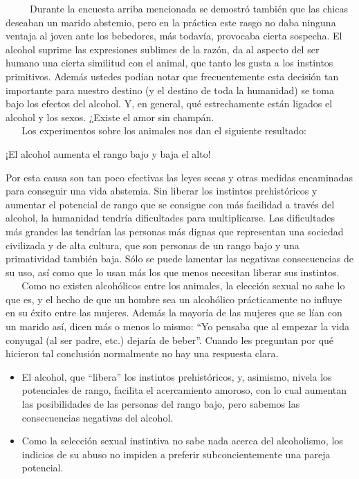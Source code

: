 ~ ~ ~ Durante la encuesta arriba mencionada se demostró también que las
chicas deseaban un marido abstemio, pero en la práctica este rasgo no
daba ninguna ventaja al joven ante los bebedores, más todavía, provocaba
cierta sospecha. El alcohol suprime las expresiones sublimes de la
razón, da al aspecto del ser humano una cierta similitud con el animal,
que tanto les gusta a los instintos primitivos. Además ustedes podían
notar que frecuentemente esta decisión tan importante para nuestro
destino (y el destino de toda la humanidad) se toma bajo los efectos del
alcohol. Y, en general, qué estrechamente están ligados el alcohol y los
sexos. ¿Existe el amor sin champán.\\
\hspace*{0.333em} ~ ~ Los experimentos sobre los animales nos dan el
siguiente resultado:

\begin{tcolorbox}
 ¡El alcohol aumenta el rango bajo y baja el alto!
\end{tcolorbox}

Por esta causa son tan poco efectivas las leyes secas y otras medidas
encaminadas para conseguir una vida abstemia. Sin liberar los instintos
prehistóricos y aumentar el potencial de rango que se consigue con más
facilidad a través del alcohol, la humanidad tendría dificultades para
multiplicarse. Las dificultades más grandes las tendrían las personas
más dignas que representan una sociedad civilizada y de alta cultura,
que son personas de un rango bajo y una primatividad también baja. Sólo
se puede lamentar las negativas consecuencias de su uso, así como que lo
usan más los que menos necesitan liberar sus instintos.\\
\hspace*{0.333em} ~ ~ Como no existen alcohólicos entre los animales, la
elección sexual no sabe lo que es, y el hecho de que un hombre sea un
alcohólico prácticamente no influye en su éxito entre las mujeres.
Además la mayoría de las mujeres que se lían con un marido así, dicen
más o menos lo mismo: ``Yo pensaba que al empezar la vida conyugal (al
ser padre, etc.) dejaría de beber''. Cuando les preguntan por qué
hicieron tal conclusión normalmente no hay una respuesta clara.

\begin{itemize}

\item
  El alcohol, que ``libera'' los instintos prehistóricos, y, asimismo,
  nivela los potenciales de rango, facilita el acercamiento amoroso, con
  lo cual aumentan las posibilidades de las personas del rango bajo,
  pero sabemos las consecuencias negativas del alcohol.
\item
  Como la selección sexual instintiva no sabe nada acerca del
  alcoholismo, los indicios de su abuso no impiden a preferir
  subconcientemente una pareja potencial.
\end{itemize}

